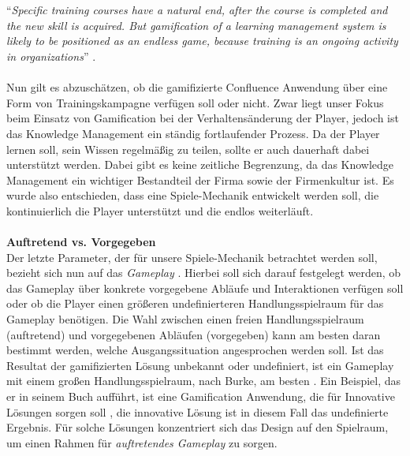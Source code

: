 \documentclass[a4paper,12pt,twoside]{scrartcl}
\begin{document}
\\\\
\enquote{\textit{Specific training courses have a natural end, after the course is completed and the new skill is acquired. But gamification of a learning management system is likely to be positioned as an endless game, because training is an ongoing activity in organizations}} \cite{gamificationDefinition}.
\\\\
Nun gilt es abzuschätzen, ob die gamifizierte Confluence Anwendung über eine Form von Trainingskampagne verfügen soll oder nicht. Zwar liegt unser Fokus beim Einsatz von Gamification bei der Verhaltensänderung der Player, jedoch ist das Knowledge Management ein ständig fortlaufender Prozess. Da der Player lernen soll, sein Wissen regelmäßig zu teilen, sollte er auch dauerhaft dabei unterstützt werden. Dabei gibt es keine zeitliche Begrenzung, da das Knowledge Management ein wichtiger Bestandteil der Firma sowie der Firmenkultur ist. Es wurde also entschieden, dass eine Spiele-Mechanik entwickelt werden soll, die kontinuierlich die Player unterstützt und die endlos weiterläuft.
\\\\
\textbf{Auftretend vs. Vorgegeben}\\
Der letzte Parameter, der für unsere Spiele-Mechanik betrachtet werden soll, bezieht sich nun auf das \textit{Gameplay} . Hierbei soll sich darauf festgelegt werden, ob das Gameplay über konkrete vorgegebene Abläufe und Interaktionen verfügen soll oder ob die Player einen größeren undefinierteren Handlungsspielraum für das Gameplay benötigen. Die Wahl zwischen einen freien Handlungsspielraum (auftretend) und vorgegebenen Abläufen (vorgegeben) kann am besten daran bestimmt werden, welche Ausgangssituation angesprochen werden soll. Ist das Resultat der gamifizierten Lösung  unbekannt oder undefiniert, ist ein Gameplay mit einem großen Handlungsspielraum, nach Burke, am besten \cite{gamificationDefinition}. Ein Beispiel, das er in seinem Buch aufführt, ist eine Gamification Anwendung, die für Innovative Lösungen sorgen soll \cite{gamificationDefinition}, die innovative Lösung ist in diesem Fall das undefinierte Ergebnis. Für solche Lösungen konzentriert sich das Design auf den Spielraum, um einen Rahmen für \textit{auftretendes Gameplay} zu sorgen.
\\\\
\end{document}

